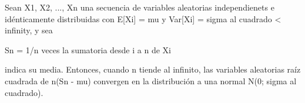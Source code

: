 \documentclass{article}
\begin{document}

Sean X1, X2, ..., Xn una secuencia de variables aleatorias
independienets e idénticamente distribuidas con
E[Xi] = mu y Var[Xi] = sigma al cuadrado < infinity,  y sea

Sn = 1/n veces la sumatoria desde i a n de Xi

indica su media. Entonces, cuando n tiende al infinito, las
variables aleatorias ra\'iz cuadrada de  n(Sn - mu) convergen en la
distribución a una normal N(0; sigma al cuadrado).
\end{document}
